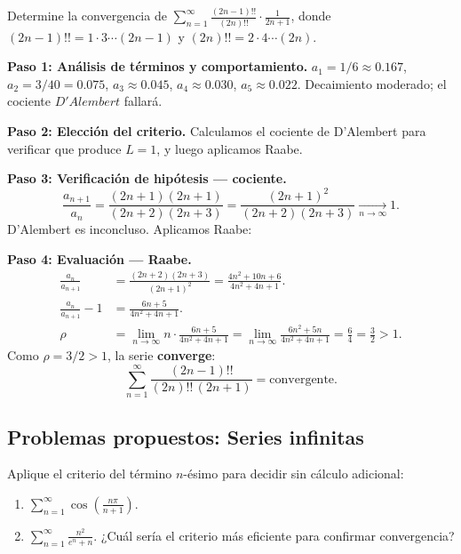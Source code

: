 \begin{example} 
Determine la convergencia de
$\displaystyle\sum_{n=1}^\infty\frac{(2n-1)!!}{(2n)!!}\cdot\frac{1}{2n+1}$,
donde $(2n-1)!! = 1\cdot 3\cdots(2n-1)$ y $(2n)!! = 2\cdot 4\cdots(2n)$.
\begin{myproof}
\textbf{Paso 1: Análisis de términos y comportamiento.}
$a_1 = 1/6 \approx 0.167$, $a_2 = 3/40 = 0.075$, $a_3 \approx 0.045$,
$a_4 \approx 0.030$, $a_5 \approx 0.022$. Decaimiento moderado; el
cociente $D'Alembert$ fallará.

\textbf{Paso 2: Elección del criterio.}
Calculamos el cociente de D'Alembert para verificar que produce $L=1$,
y luego aplicamos Raabe.

\textbf{Paso 3: Verificación de hipótesis — cociente.}
\[
  \frac{a_{n+1}}{a_n}
  = \frac{(2n+1)(2n+1)}{(2n+2)(2n+3)}
  = \frac{(2n+1)^2}{(2n+2)(2n+3)}
  \xrightarrow[n\to\infty]{} 1.
\]
D'Alembert es inconcluso. Aplicamos Raabe:

\textbf{Paso 4: Evaluación — Raabe.}
\begin{align*}
  \frac{a_n}{a_{n+1}}
  &= \frac{(2n+2)(2n+3)}{(2n+1)^2}
   = \frac{4n^2+10n+6}{4n^2+4n+1}. \\
  \frac{a_n}{a_{n+1}}-1
  &= \frac{6n+5}{4n^2+4n+1}. \\
  \rho &= \lim_{n\to\infty} n\cdot\frac{6n+5}{4n^2+4n+1}
        = \lim_{n\to\infty}\frac{6n^2+5n}{4n^2+4n+1}
        = \frac{6}{4} = \frac{3}{2} > 1.
\end{align*}
Como $\rho = 3/2 > 1$, la serie \textbf{converge}:
\[
  \sum_{n=1}^\infty\frac{(2n-1)!!}{(2n)!!\,(2n+1)}
  = \boxed{\text{convergente.}}
\]
\end{myproof}
\end{example}

\subsection{Problemas propuestos: Series infinitas}



\begin{prob}
Aplique el criterio del término $n$-ésimo para decidir sin cálculo adicional:
\begin{enumerate}
  \item $\displaystyle\sum_{n=1}^\infty \cos\!\left(\frac{n\pi}{n+1}\right)$.
  \item $\displaystyle\sum_{n=1}^\infty \frac{n^2}{e^n+n}$.
        ¿Cuál sería el criterio más eficiente para confirmar convergencia?
\end{enumerate}
\end{prob}

